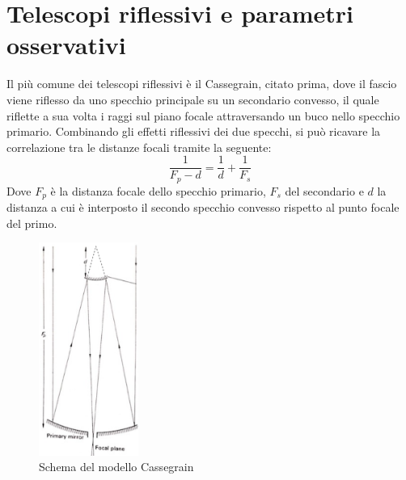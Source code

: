 
\section{Telescopi riflessivi e parametri osservativi}

Il più comune dei telescopi riflessivi è il Cassegrain, citato prima, dove il fascio viene riflesso da uno specchio principale su un secondario convesso, il quale riflette a sua volta i raggi sul piano focale attraversando un buco nello specchio primario. Combinando gli effetti riflessivi dei due specchi, si può ricavare la correlazione tra le distanze focali tramite la seguente:
\begin{equation*}
	\frac{1}{F_p-d}=\frac{1}{d}+\frac{1}{F_s}
\end{equation*}
Dove $F_p$ è la distanza focale dello specchio primario, $F_s$ del secondario e $d$ la distanza a cui è interposto il secondo specchio convesso rispetto al punto focale del primo.

\begin{figure}
	\vspace{-10pt}
	\centering
	\includegraphics[width=0.29\textwidth]{Immagini/Capitolo2/Cassegrain.PNG}
	\caption{Schema del modello Cassegrain}
	\vspace{-30pt}
\end{figure}

